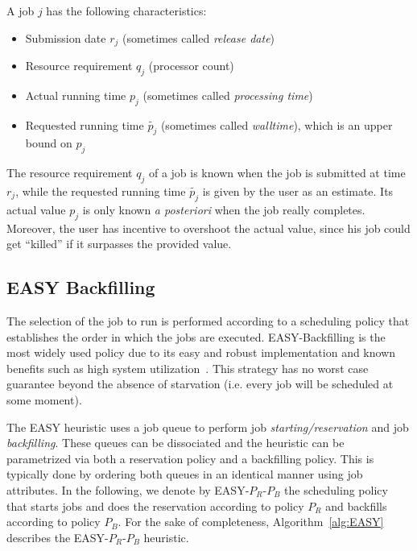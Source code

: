 A job $j$ has the following characteristics:

\begin{itemize}
  \item Submission date $r_j$ (sometimes called \textit{release date})

  \item Resource requirement $q_j$ (processor count)

  \item Actual running time  $p_j$ (sometimes called \textit{processing time})

  \item Requested running time $\widetilde{p_j}$ (sometimes called \textit{walltime}), which is an upper bound on $p_j$
\end{itemize}

The resource requirement $q_j$ of a job is known when the job is submitted at
time $r_j$, while the requested running time $\widetilde{p_j}$ is given by the
user as an estimate. Its actual value $p_j$ is only known \textit{a posteriori}
when the job really completes.  Moreover, the user has incentive to
overshoot the actual value, since his job could get ``killed'' if it
surpasses the provided value.

\subsection{EASY Backfilling}
\label{sub:notation}

The selection of the job to run is performed according to a
scheduling policy that establishes the order in which the jobs are executed.
EASY-Backfilling is the most widely used policy due to its easy and robust
implementation and known benefits such as high system
utilization~\cite{Feitelson}. This strategy has no worst case guarantee beyond
the absence of starvation (i.e. every job will be scheduled at some moment).

The EASY heuristic uses a job queue to perform job
\textit{starting/reservation} and job \textit{backfilling}. These queues can be
dissociated and the heuristic can be parametrized via both a reservation policy
and a backfilling policy. This is typically done by ordering both queues in an
identical manner using job attributes. In the following, we denote by
EASY-$P_R$-$P_B$ the scheduling policy that starts jobs and does the
reservation according to policy $P_R$ and backfills according to policy $P_B$.
For the sake of completeness, Algorithm~\ref{alg:EASY} describes the
EASY-$P_R$-$P_B$ heuristic.

